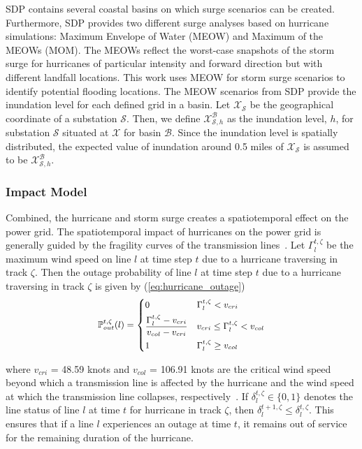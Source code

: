 SDP contains several coastal basins on which surge scenarios can be created. Furthermore, SDP provides two different surge analyses based on hurricane simulations: Maximum Envelope of Water (MEOW) and Maximum of the MEOWs (MOM). The MEOWs reflect the worst-case snapshots of the storm surge for hurricanes of particular intensity and forward direction but with different landfall locations. This work uses MEOW for storm surge scenarios to identify potential flooding locations. The MEOW scenarios from SDP provide the inundation level for each defined grid in a basin. Let $\mathcal{X}_\mathcal{S}$ be the geographical coordinate of a substation $\mathcal{S}$. Then, we define $\mathcal{X}^\mathcal{B}_{\mathcal{S}, h}$ as the inundation level, $h$, for substation $\mathcal{S}$ situated at $\mathcal{X}$ for basin $\mathcal{B}$. Since the inundation level is spatially distributed, the expected value of inundation around 0.5 miles of $\mathcal{X}_\mathcal{S}$ is assumed to be $\mathcal{X}^\mathcal{B}_{\mathcal{S}, h}$. 

\subsubsection{Impact Model}
Combined, the hurricane and storm surge creates a spatiotemporal effect on the power grid. The spatiotemporal impact of hurricanes on the power grid is generally guided by the fragility curves of the transmission lines~\cite{7801854}. Let $\Gamma_{l}^{t,\zeta}$ be the maximum wind speed on line $l$ at time step $t$ due to a hurricane traversing in track $\zeta$. Then the outage probability of line $l$ at time step $t$ due to a hurricane traversing in track $\zeta$ is given by (\ref{eq:hurricane_outage})      
\vspace{-1em}
\begin{equation}
\small
\begin{aligned}
&\mathbb{P}_{out}^{t,\zeta}(l)= \begin{dcases} 0 & \Gamma_{l}^{t,\zeta} < v_{cri} \\
\frac{\Gamma_{l}^{t,\zeta} - v_{cri}}{v_{col} - v_{cri}}  & v_{cri} \leq \Gamma_{l}^{t,\zeta} < v_{col} \\
1 & \Gamma_{l}^{t,\zeta} \geq v_{col} \end{dcases} \\
\end{aligned}
\label{eq:hurricane_outage}
\end{equation}

\noindent
where $v_{cri}$ = 48.59 knots and $v_{col}$ = 106.91 knots are the critical wind speed beyond which a transmission line is affected by the hurricane and the wind speed at which the transmission line collapses, respectively~\cite{9917119}. If $\delta_{l}^{t,\zeta} \in \{0,1\}$ denotes the line status of line $l$ at time $t$ for hurricane in track $\zeta$, then $\delta_{l}^{t + 1,\zeta} \leq  \delta_{l}^{t,\zeta}$. This ensures that if a line $l$ experiences an outage at time $t$, it remains out of service for the remaining duration of the hurricane.    

